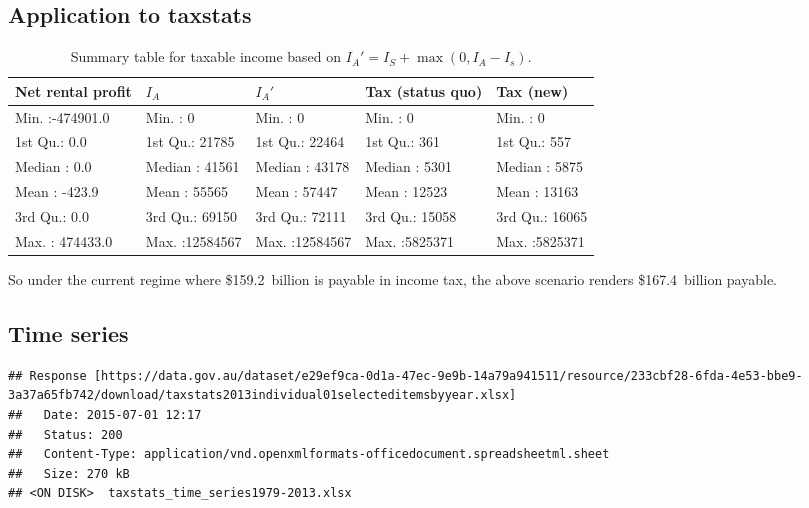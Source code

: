 \documentclass{grattan}\usepackage[]{graphicx}\usepackage[]{color}
\makeatletter
\newenvironment{kframe}{%
 \def\at@end@of@kframe{}%
 \ifinner\ifhmode%
  \def\at@end@of@kframe{\end{minipage}}%
  \begin{minipage}{\columnwidth}%
 \fi\fi%
 \def\FrameCommand##1{\hskip\@totalleftmargin \hskip-\fboxsep
 \colorbox{shadecolor}{##1}\hskip-\fboxsep
     \hskip-\linewidth \hskip-\@totalleftmargin \hskip\columnwidth}%
 \MakeFramed {\advance\hsize-\width
   \@totalleftmargin\z@ \linewidth\hsize
   \@setminipage}}%
 {\par\unskip\endMakeFramed%
 \at@end@of@kframe}
\newenvironment{knitrout}{}{} %
\makeatother
\begin{document}
\subsection{Application to taxstats}
\begin{table*}[ht]
\centering
\caption{Summary table for taxable income based on $I_A' = I_S + \max(0, I_A - I_s)$.} 
\begin{tabular}{lllll}
  \hline
Net rental profit &     $I_A$ &     $I_A'$ & Tax (status quo) &   Tax (new) \\ 
  \hline
Min.   :-474901.0   & Min.   :       0   & Min.   :       0   & Min.   :      0   & Min.   :      0   \\ 
  1st Qu.:      0.0   & 1st Qu.:   21785   & 1st Qu.:   22464   & 1st Qu.:    361   & 1st Qu.:    557   \\ 
  Median :      0.0   & Median :   41561   & Median :   43178   & Median :   5301   & Median :   5875   \\ 
  Mean   :   -423.9   & Mean   :   55565   & Mean   :   57447   & Mean   :  12523   & Mean   :  13163   \\ 
  3rd Qu.:      0.0   & 3rd Qu.:   69150   & 3rd Qu.:   72111   & 3rd Qu.:  15058   & 3rd Qu.:  16065   \\ 
  Max.   : 474433.0   & Max.   :12584567   & Max.   :12584567   & Max.   :5825371   & Max.   :5825371   \\ 
   \hline
\end{tabular}
\end{table*}

So under the current regime where \$159.2~billion is payable in income tax, the above scenario renders \$167.4~billion payable.
\clearpage


\subsection{Time series}
\begin{knitrout}
\color{fgcolor}\begin{kframe}
\begin{verbatim}
## Response [https://data.gov.au/dataset/e29ef9ca-0d1a-47ec-9e9b-14a79a941511/resource/233cbf28-6fda-4e53-bbe9-3a37a65fb742/download/taxstats2013individual01selecteditemsbyyear.xlsx]
##   Date: 2015-07-01 12:17
##   Status: 200
##   Content-Type: application/vnd.openxmlformats-officedocument.spreadsheetml.sheet
##   Size: 270 kB
## <ON DISK>  taxstats_time_series1979-2013.xlsx
\end{verbatim}
\end{kframe}
\end{knitrout}
\end{document}
